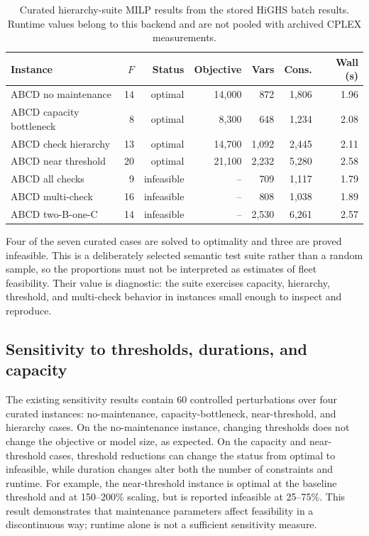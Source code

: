 \begin{table}[t]
\centering\scriptsize
\caption{Curated hierarchy-suite MILP results from the stored HiGHS batch
results. Runtime values belong to this backend and are not pooled with archived
CPLEX measurements.}
\label{tab:hierarchy_batch}
\begin{tabular}{lrrrrrr}
\toprule
Instance & $F$ & Status & Objective & Vars & Cons. & Wall (s) \\
\midrule
ABCD no maintenance & 14 & optimal & 14,000 & 872 & 1,806 & 1.96 \\
ABCD capacity bottleneck & 8 & optimal & 8,300 & 648 & 1,234 & 2.08 \\
ABCD check hierarchy & 13 & optimal & 14,700 & 1,092 & 2,445 & 2.11 \\
ABCD near threshold & 20 & optimal & 21,100 & 2,232 & 5,280 & 2.58 \\
ABCD all checks & 9 & infeasible & -- & 709 & 1,117 & 1.79 \\
ABCD multi-check & 16 & infeasible & -- & 808 & 1,038 & 1.89 \\
ABCD two-B-one-C & 14 & infeasible & -- & 2,530 & 6,261 & 2.57 \\
\bottomrule
\end{tabular}
\end{table}

Four of the seven curated cases are solved to optimality and three are proved
infeasible. This is a deliberately selected semantic test suite rather than a
random sample, so the proportions must not be interpreted as estimates of fleet
feasibility. Their value is diagnostic: the suite exercises capacity,
hierarchy, threshold, and multi-check behavior in instances small enough to
inspect and reproduce.

\subsection{Sensitivity to thresholds, durations, and capacity}

The existing sensitivity results contain 60 controlled perturbations over four
curated instances: no-maintenance, capacity-bottleneck, near-threshold, and
hierarchy cases. On the no-maintenance instance, changing thresholds
does not change the objective or model size, as expected. On the capacity and
near-threshold cases, threshold reductions can change the status from optimal
to infeasible, while duration changes alter both the number of constraints and
runtime. For example, the near-threshold instance is optimal at the baseline
threshold and at 150--200\% scaling, but is reported infeasible at 25--75\%.
This result demonstrates that maintenance parameters affect feasibility in a
discontinuous way; runtime alone is not a sufficient sensitivity measure.

